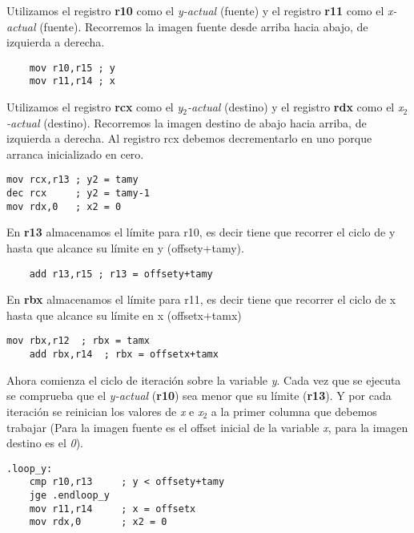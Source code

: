 \documentclass[a4paper]{article}
\begin{document}
 \indent Utilizamos el registro \textbf{r10} como el \emph{y-actual} (fuente) y el registro \textbf{r11} como el \emph{x-actual} (fuente). Recorremos la imagen fuente desde arriba hacia abajo, de izquierda a derecha.\\
 \begin{codesnippet}
\begin{verbatim}
	mov r10,r15 ; y
	mov r11,r14 ; x
\end{verbatim}
\end{codesnippet}
 \indent Utilizamos el registro \textbf{rcx} como el \emph{y$_2$-actual} (destino) y el registro \textbf{rdx} como el \emph{x$_2$-actual} (destino). Recorremos la imagen destino de abajo hacia arriba, de izquierda a derecha. Al registro rcx debemos decrementarlo en uno porque arranca inicializado en cero. \\
 \begin{codesnippet}
\begin{verbatim}
mov rcx,r13 ; y2 = tamy
dec rcx     ; y2 = tamy-1
mov rdx,0   ; x2 = 0
\end{verbatim}
\end{codesnippet}

\indent En \textbf{r13} almacenamos el l\'imite para r10, es decir tiene que recorrer el ciclo de y hasta que alcance su l\'imite en y (offsety+tamy). \\
	  \begin{codesnippet}
\begin{verbatim}
	add r13,r15 ; r13 = offsety+tamy
\end{verbatim}
\end{codesnippet}
\indent En \textbf{rbx} almacenamos el l\'imite para r11, es decir tiene que recorrer el ciclo de x hasta que alcance su l\'imite en x (offsetx+tamx)\\
	  \begin{codesnippet}
\begin{verbatim}
mov rbx,r12  ; rbx = tamx
	add rbx,r14  ; rbx = offsetx+tamx
\end{verbatim}
\end{codesnippet}

\indent Ahora comienza el ciclo de iteraci\'on sobre la variable \emph{y}. Cada vez que se ejecuta se comprueba que el \emph{y-actual} (\textbf{r10}) sea menor que su l\'imite (\textbf{r13}). Y por cada iteraci\'on se reinician los valores de \emph{x} e \emph{x$_2$} a la primer columna que debemos trabajar (Para la imagen fuente es el offset inicial de la variable \emph{x}, para la imagen destino es el \emph{0}).
	  \begin{codesnippet}
\begin{verbatim}
.loop_y:
	cmp r10,r13     ; y < offsety+tamy
	jge .endloop_y
	mov r11,r14     ; x = offsetx
	mov rdx,0       ; x2 = 0
\end{verbatim}
\end{codesnippet}
\end{document}
